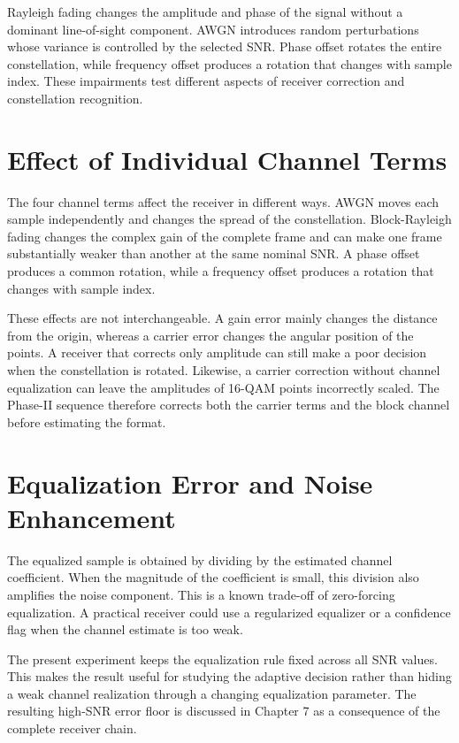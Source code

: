 \documentclass[12pt,twoside,openright]{report}
\begin{document}
Rayleigh fading changes the amplitude and phase of the signal without a
dominant line-of-sight component. AWGN introduces random perturbations whose
variance is controlled by the selected SNR. Phase offset rotates the entire
constellation, while frequency offset produces a rotation that changes with
sample index. These impairments test different aspects of receiver
correction and constellation recognition.

\section{Effect of Individual Channel Terms}
The four channel terms affect the receiver in different ways. AWGN moves
each sample independently and changes the spread of the constellation.
Block-Rayleigh fading changes the complex gain of the complete frame and
can make one frame substantially weaker than another at the same nominal
SNR. A phase offset produces a common rotation, while a frequency offset
produces a rotation that changes with sample index.

These effects are not interchangeable. A gain error mainly changes the
distance from the origin, whereas a carrier error changes the angular
position of the points. A receiver that corrects only amplitude can still
make a poor decision when the constellation is rotated. Likewise, a
carrier correction without channel equalization can leave the amplitudes
of 16-QAM points incorrectly scaled. The Phase-II sequence therefore
corrects both the carrier terms and the block channel before estimating the
format.

\section{Equalization Error and Noise Enhancement}
The equalized sample is obtained by dividing by the estimated channel
coefficient. When the magnitude of the coefficient is small, this division
also amplifies the noise component. This is a known trade-off of
zero-forcing equalization. A practical receiver could use a regularized
equalizer or a confidence flag when the channel estimate is too weak.

The present experiment keeps the equalization rule fixed across all SNR
values. This makes the result useful for studying the adaptive decision
rather than hiding a weak channel realization through a changing
equalization parameter. The resulting high-SNR error floor is discussed in
Chapter 7 as a consequence of the complete receiver chain.
\end{document}
